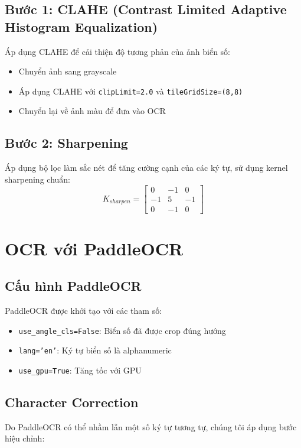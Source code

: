 \subsection{Bước 1: CLAHE (Contrast Limited Adaptive Histogram Equalization)}
Áp dụng CLAHE để cải thiện độ tương phản của ảnh biển số:
\begin{itemize}
    \item Chuyển ảnh sang grayscale
    \item Áp dụng CLAHE với \texttt{clipLimit=2.0} và \texttt{tileGridSize=(8,8)}
    \item Chuyển lại về ảnh màu để đưa vào OCR
\end{itemize}

\subsection{Bước 2: Sharpening}
Áp dụng bộ lọc làm sắc nét để tăng cường cạnh của các ký tự, sử dụng kernel sharpening chuẩn:
\begin{equation}
K_{sharpen} = \begin{bmatrix}
0 & -1 & 0 \\
-1 & 5 & -1 \\
0 & -1 & 0
\end{bmatrix}
\end{equation}

\section{OCR với PaddleOCR}

\subsection{Cấu hình PaddleOCR}
PaddleOCR được khởi tạo với các tham số:
\begin{itemize}
    \item \texttt{use\_angle\_cls=False}: Biển số đã được crop đúng hướng
    \item \texttt{lang='en'}: Ký tự biển số là alphanumeric
    \item \texttt{use\_gpu=True}: Tăng tốc với GPU
\end{itemize}

\subsection{Character Correction}
Do PaddleOCR có thể nhầm lẫn một số ký tự tương tự, chúng tôi áp dụng bước hiệu chỉnh:

